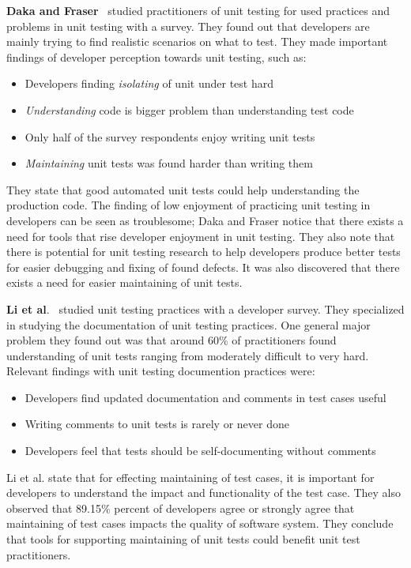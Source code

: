     \textbf{Daka and Fraser}~\cite{daka2014survey} studied practitioners of unit testing for used practices and problems in unit testing with a survey.
    They found out that developers are mainly trying to find realistic scenarios on what to test.
    They made important findings of developer perception towards unit testing, such as:
    \begin{itemize}
    \item Developers finding \textit{isolating} of unit under test hard
    \item \textit{Understanding} code is bigger problem than understanding test code
    \item Only half of the survey respondents enjoy writing unit tests
    \item \textit{Maintaining} unit tests was found harder than writing them
    \end{itemize}
    They state that good automated unit tests could help understanding the production code.
    The finding of low enjoyment of practicing unit testing in developers can be seen as troublesome;
    Daka and Fraser notice that there exists a need for tools that rise developer enjoyment in unit testing.
    They also note that there is potential for unit testing research to help developers produce better tests for easier debugging and fixing
    of found defects. It was also discovered that there exists a need for easier maintaining of unit tests.

    \textbf{Li et al}.~\cite{li2016automatically} studied unit testing practices with a developer survey. They specialized in studying
    the documentation of unit testing practices. One general major problem they found out was that around 60\% of practitioners found understanding of
    unit tests ranging from moderately difficult to very hard. Relevant findings with unit testing documention practices
    were:

    \begin{itemize}
    \item Developers find updated documentation and comments in test cases useful
    \item Writing comments to unit tests is rarely or never done
    \item Developers feel that tests should be self-documenting without comments
    \end{itemize}

    Li et al. state that for effecting maintaining of test cases, it is important for developers to understand the impact and
    functionality of the test case. They also observed that 89.15\% percent of developers agree or strongly agree that maintaining
    of test cases impacts the quality of software system. They conclude that tools for supporting maintaining of unit tests could
    benefit unit test practitioners.


